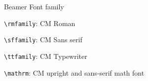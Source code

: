
\begin{frame}[fragile]{Beamer Font family}

    \verb|\rmfamily|: \rmfamily CM Roman
    
    \verb|\sffamily|: \sffamily CM Sans serif
    
    \verb|\ttfamily|: \ttfamily CM Typewriter
    
    \verb|\mathrm|: \mathrm CM upright and sans-serif math font
    
\end{frame}